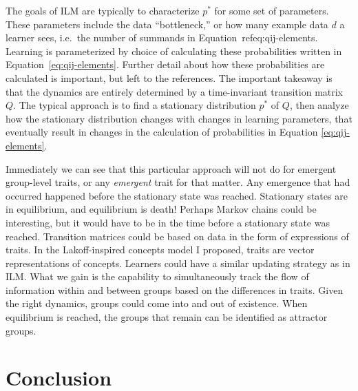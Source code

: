 \documentclass[11pt,letterpaper]{article}
\begin{document}
The goals of ILM are typically to characterize $p^*$ for some set of 
parameters. These parameters include the data ``bottleneck,'' or how many example data $d$ 
a learner sees, i.e.\ the number of summands in Equation~ref{eq:qij-elements}.
Learning is parameterized by choice of calculating these
probabilities written in Equation~\ref{eq:qij-elements}. Further detail about
how these probabilities are calculated is important, but left to the 
references. The important takeaway is that the dynamics are entirely determined
by a time-invariant transition matrix $Q$. The typical approach is to find
a stationary distribution $p^*$ of $Q$, then analyze how the stationary
distribution changes with changes in learning parameters, that eventually
result in changes in the calculation of probabilities in Equation \ref{eq:qij-elements}.

Immediately we can see that this particular approach will not do for
emergent group-level traits, or any \emph{emergent} trait for that matter. 
Any emergence that had occurred happened before the stationary state was
reached. Stationary states are in equilibrium, and equilibrium is death! 
Perhaps Markov chains could be interesting, but it would have to be in 
the time before a stationary state was reached. Transition matrices
could be based on data in the form of expressions of traits. In the
Lakoff-inspired concepts model I proposed, traits are vector representations of 
concepts. Learners could
have a similar updating strategy as in ILM. What we gain is the capability
to simultaneously track the flow of information within and between groups
based on the differences in traits. Given the right dynamics, groups could
come into and out of existence. When equilibrium is reached, the groups that
remain can be identified as attractor groups.

\section{Conclusion}\label{conclusion}
\end{document}
